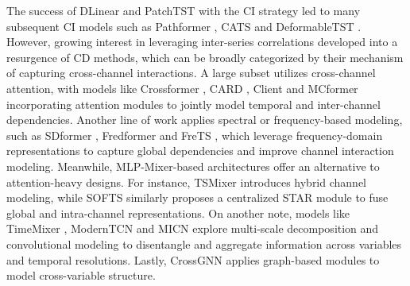 \documentclass[a4paper,oneside,bibliography=totoc]{scrbook}
\begin{document}
The success of DLinear \cite{zeng_are_2023} and PatchTST \cite{nie_time_2022} with the CI strategy led to many subsequent CI models such as Pathformer \cite{chen_pathformer_2023}, CATS \cite{kim_are_2024} and DeformableTST \cite{luo_deformabletst_2024}. However, growing interest in leveraging inter-series correlations developed into a resurgence of CD methods, which can be broadly categorized by their mechanism of capturing cross-channel interactions.
A large subset utilizes cross-channel attention, with models like Crossformer \cite{zhang_crossformer_2022}, CARD \cite{wang_card_2023}, Client \cite{gao_client_2023} and MCformer \cite{han_mcformer_2024} incorporating attention modules to jointly model temporal and inter-channel dependencies. Another line of work applies spectral or frequency-based modeling, such as SDformer \cite{chen_sdformer_2024}, Fredformer \cite{piao_fredformer_2024} and FreTS \cite{yi_frequency-domain_2023}, which leverage frequency-domain representations to capture global dependencies and improve channel interaction modeling.
Meanwhile, MLP-Mixer-based architectures offer an alternative to attention-heavy designs. 
For instance, TSMixer \cite{ekambaram_tsmixer_2023} introduces hybrid channel modeling, while SOFTS \cite{han_softs_2024} similarly proposes a centralized STAR module to fuse global and intra-channel representations.
On another note, models like TimeMixer \cite{wang_timemixer_2023}, ModernTCN \cite{donghao_moderntcn_2023} and MICN \cite{wang_micn_2022} explore multi-scale decomposition and convolutional modeling to disentangle and aggregate information across variables and temporal resolutions. 
Lastly, CrossGNN \cite{huang_crossgnn_2023} applies graph-based modules to model cross-variable structure.





\end{document}
